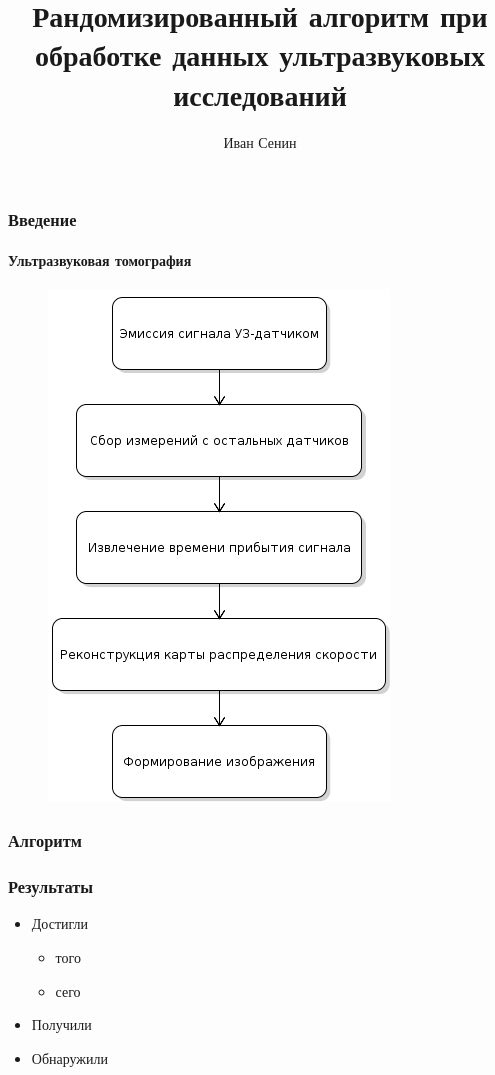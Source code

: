 \documentclass{beamer}
\begin{document}
\title[Бакалаврская работа]{Рандомизированный алгоритм при обработке данных ультразвуковых исследований}

\author[Иван Сенин]{
    \begin{flushright}
    Иван Сенин \\
    {\footnotesize\textcolor{gray}}
    \end{flushright}
}

\date{}


\frame{\titlepage}

\begin{frame}
\frametitle{Введение}
\framesubtitle{Ультразвуковая томография}


\begin{figure}[!ht]
\begin{flushleft}
  \includegraphics[scale=0.4]{pics/us_process.png}
\end{flushleft}
\end{figure}




\end{frame}


\begin{frame}\frametitle{Алгоритм}



\end{frame}

\begin{frame}\frametitle{Результаты}
\Large
\begin{itemize}
    \item Достигли
    \begin{itemize}
        \item того
        \item сего
    \end{itemize}
    \item Получили
    \item Обнаружили
\end{itemize}
\end{frame}



\begin{frame}
\end{frame}
\end{document}
